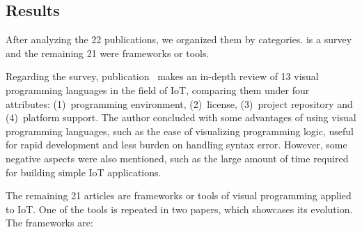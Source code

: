 \subsection{Results}\label{sec:slr_results}

After analyzing the 22 publications, we organized them by categories. \cite{survey_vpl_iot} is a survey and the remaining 21 were frameworks or tools.

Regarding the survey, publication~\cite{survey_vpl_iot} makes an in-depth review of 13 visual programming languages in the field of IoT, comparing them under four attributes: (1)~programming environment, (2)~license, (3)~project repository and (4)~platform support. The author concluded with some advantages of using visual programming languages, such as the ease of visualizing programming logic, useful for rapid development and less burden on handling syntax error. However, some negative aspects were also mentioned, such as the large amount of time required for building simple IoT applications.

The remaining 21 articles are frameworks or tools of visual programming applied to IoT. One of the tools is repeated in two papers, which showcases its evolution. The frameworks are:

